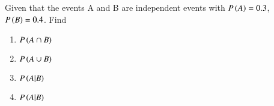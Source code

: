 \begin{flushleft}
Given that the events A and B are independent events with $P\left(A\right)=0.3$, $P\left(B\right)=0.4$. Find
\begin{enumerate}
\item $P\left(A \cap B\right)$
\item $P\left(A \cup B\right)$
\item $P\left(A|B\right)$
\item $P\left(A|B\right)$
\end{enumerate}
\end{flushleft}